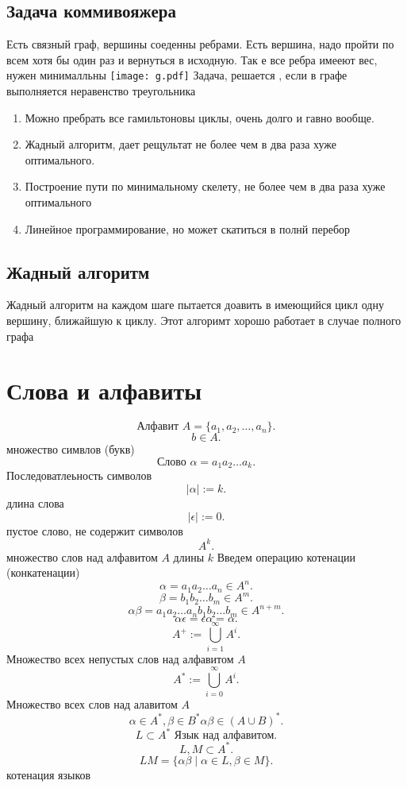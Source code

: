 \documentclass[14pt]{extarticle}
\begin{document}
\subsection{Задача коммивояжера}
Есть связный граф, вершины соеденны ребрами. Есть вершина, надо пройти по всем хотя бы  один раз и вернуться в исходную. Так е все ребра имееют вес, нужен минималльны
\texttt{[image: g.pdf]}
Задача, решается , если в графе выполняется неравенство треугольника
\begin{enumerate}
    \item Можно пребрать все гамильтоновы циклы, очень долго и гавно вообще.
    \item Жадный алгоритм, дает рещультат не более чем в два раза хуже оптимального.
    \item Построение пути по минимальному скелету, не более чем в два раза хуже оптимального
    \item Линейное программирование, но может скатиться в полнй перебор
\end{enumerate}
\subsection{Жадный алгоритм}
Жадный алгоритм на каждом шаге пытается доавить в имеющийся цикл одну вершину, ближайшую к циклу. Этот алгоримт хорошо работает в случае полного графа
\section{Слова и алфавиты}
\[
    \text{Алфавит~} A = \{a_1,a_2,\dots,a_{n}\}
.\] 
\[
b \in A
.\] 
множество симвлов (букв)
\[
    \text{Слово~} \alpha = a_1 a_2 \dots a_{k}
.\] 
Последоватлеьность символов
\[
\mid \alpha \mid := k
.\] 
длина слова
\[
\mid \epsilon \mid := 0
.\] 
пустое слово, не содержит символов
\[
A^{k} 
.\] 
множество слов над алфавитом $A$ длины  $k$
Введем операцию котенации (конкатенации)
 \[
\alpha = a_1 a_2 \dots a_{n} \in A^{n}
.\] 
\[
\beta = b_1 b_2 \dots b_{m} \in A^{m}
.\] 
\[
\alpha \beta = a_1 a_2 \dots a_{n} b_1 b_2 \dots b_{m} \in A^{n+m}
.\] 
\[
\alpha \epsilon = \epsilon \alpha = \alpha
.\] 
\[
    A^{+} := \bigcup \limits_{i = 1}^{\infty} A^{i}
.\] 
Множество всех непустых слов над алфавитом $A$
\[
    A^{*} := \bigcup \limits_{i = 0}^{\infty} A^{i}
.\] 
Множество всех слов над алавитом $A$ 
\[
\alpha \in A^{*}, \beta \in B^{*} \alpha \beta \in (A \cup B)^{*}
.\] 
\[
    L \subset A^{*} \text{~Язык над алфавитом}
.\] 
\[
L, M \subset A^{*}
.\] 
\[
    LM = \{\alpha \beta \mid \alpha \in L , \beta \in M\}
.\] 
котенация языков
\end{document}
